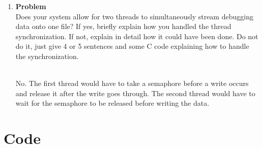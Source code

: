 \documentclass[12pt]{article}
\newenvironment{Ex}{\textbf{Problem}\vspace{.25em}\\}{}
\newcommand{\hbr}{\hfill\vspace{.25em}\\}
\begin{document}
\begin{enumerate}
\begin{Ex}
    could have been done).
    \begin{solution} \hbr
      Given that we are using FAT32, we are able to store 4194304
      files. \\
      We can increase the maximum number of files that may be stored
      on the disk by shrinking the default cluster size -- smaller
      clusters will result in less wasted space for the last block of
      each file, allowing additional information to be packed into the
      same amount of storage space.
    \end{solution}
  \end{Ex}
\item
  \begin{Ex}
    Does your system allow for two threads to simultaneously stream
    debugging data onto one file? If yes, briefly explain how you
    handled the thread synchronization. If not, explain in detail how
    it could have been done. Do not do it, just give 4 or 5 sentences
    and some C code explaining how to handle the synchronization.
    \begin{solution} \hbr
    No. The first thread would have to take a semaphore before a write
    occurs and release it after the write goes through. The second
    thread would have to wait for the semaphore to be released before
    writing the data.
    \end{solution}
  \end{Ex}
\end{enumerate}

\newpage
\section{Code}






\end{document}
